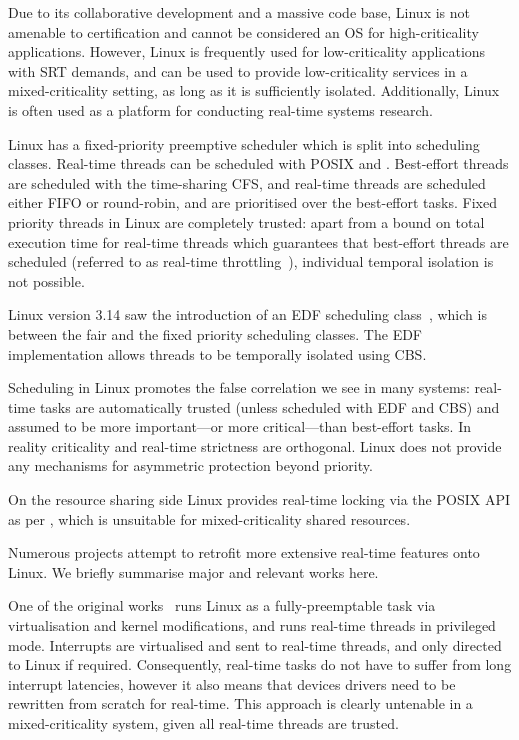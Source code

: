 Due to its collaborative development and a massive code base, Linux is not amenable to
certification and cannot be considered an \gls{OS} for high-criticality applications. However, Linux
is frequently used for low-criticality applications with \gls{SRT} demands, and can be used to
provide low-criticality services in a mixed-criticality setting, as long as it is sufficiently
isolated. Additionally, Linux is often used as a platform for conducting real-time systems research. 

Linux has a fixed-priority preemptive scheduler which is split into scheduling classes.  Real-time
threads can be scheduled with \gls{POSIX} \schedfifo and \schedsporadic. Best-effort threads are
scheduled with the time-sharing \gls{CFS}, and real-time threads are scheduled either \gls{FIFO} or round-robin, and
are prioritised over the best-effort tasks.  Fixed priority threads in Linux are completely trusted:
apart from a bound on total execution time for real-time threads which guarantees that best-effort
threads are scheduled (referred to as real-time throttling~\citep{Corbet_08}), individual temporal
isolation is not possible.

Linux version 3.14 saw the introduction of an \gls{EDF} scheduling class~\citep{Corbet_09},
which is between the fair and the fixed priority scheduling classes.  The \gls{EDF} implementation
allows threads to be temporally isolated using \gls{CBS}.

Scheduling in Linux promotes the false correlation we see in many systems: real-time tasks are
automatically trusted (unless scheduled with \gls{EDF} and \gls{CBS}) and assumed to be more important---or more
critical---than best-effort tasks.  In reality criticality and real-time strictness are orthogonal.
Linux does not provide any mechanisms for asymmetric protection beyond priority.

On the resource sharing side Linux provides real-time locking via the \gls{POSIX} API as per
, which is unsuitable for mixed-criticality shared resources.

Numerous projects attempt to retrofit more extensive real-time features onto
Linux.  We briefly summarise major and relevant works here. 

One of the original
works~\citep{Yodaiken_Barabanov_97} runs Linux as a fully-preemptable task via virtualisation and
kernel modifications, and runs real-time threads in privileged mode. Interrupts are virtualised and
sent to real-time threads, and only directed to
Linux if required. Consequently, real-time tasks do not have to suffer from long interrupt
latencies, however it also means that devices drivers need to be rewritten from scratch for
real-time. This approach is clearly untenable in a mixed-criticality system, given all real-time
threads are trusted. 

